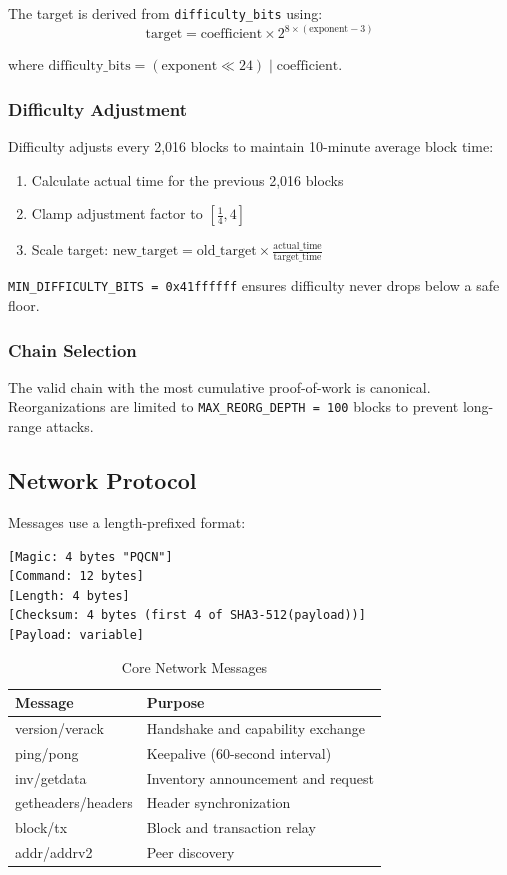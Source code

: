 \documentclass[11pt,a4paper]{article}
\begin{document}
The target is derived from \texttt{difficulty\_bits} using:
\begin{equation}
\text{target} = \text{coefficient} \times 2^{8 \times (\text{exponent} - 3)}
\end{equation}

where $\text{difficulty\_bits} = (\text{exponent} \ll 24) \mid \text{coefficient}$.

\subsubsection{Difficulty Adjustment}

Difficulty adjusts every 2,016 blocks to maintain 10-minute average block time:

\begin{enumerate}
    \item Calculate actual time for the previous 2,016 blocks
    \item Clamp adjustment factor to $[\frac{1}{4}, 4]$
    \item Scale target: $\text{new\_target} = \text{old\_target} \times \frac{\text{actual\_time}}{\text{target\_time}}$
\end{enumerate}

\texttt{MIN\_DIFFICULTY\_BITS = 0x41ffffff} ensures difficulty never drops below a safe floor.

\subsubsection{Chain Selection}

The valid chain with the most cumulative proof-of-work is canonical. Reorganizations are limited to \texttt{MAX\_REORG\_DEPTH = 100} blocks to prevent long-range attacks.

\subsection{Network Protocol}

Messages use a length-prefixed format:

\begin{lstlisting}
[Magic: 4 bytes "PQCN"]
[Command: 12 bytes]
[Length: 4 bytes]
[Checksum: 4 bytes (first 4 of SHA3-512(payload))]
[Payload: variable]
\end{lstlisting}

\begin{table}[h]
\centering
\caption{Core Network Messages}
\begin{tabular}{@{}ll@{}}
\toprule
Message & Purpose \\
\midrule
version/verack & Handshake and capability exchange \\
ping/pong & Keepalive (60-second interval) \\
inv/getdata & Inventory announcement and request \\
getheaders/headers & Header synchronization \\
block/tx & Block and transaction relay \\
addr/addrv2 & Peer discovery \\
\bottomrule
\end{tabular}
\end{table}
\end{document}
